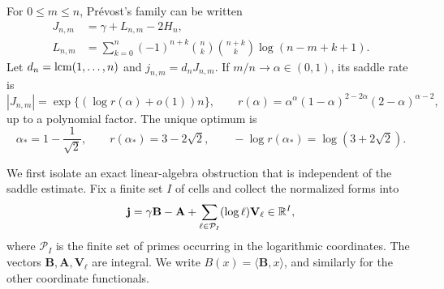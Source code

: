 For \(0\le m\le n\), Pr\'evost's family \cite{Prevost2008} can be written
\begin{align}
 J_{n,m}&=\gamma+L_{n,m}-2H_n,\label{eq:prevost-form}\\
 L_{n,m}&=\sum_{k=0}^n(-1)^{n+k}
 \binom nk\binom{n+k}k\log(n-m+k+1).
 \label{eq:prevost-log}
\end{align}
Let \(d_n=\operatorname{lcm}(1,\ldots,n)\) and \(j_{n,m}=d_nJ_{n,m}\).  If
\(m/n\to\alpha\in(0,1)\), its saddle rate is
\begin{equation}\label{eq:prevost-rate}
 |J_{n,m}|=\exp\{(\log r(\alpha)+o(1))n\},
 \qquad
 r(\alpha)=
 \alpha^\alpha(1-\alpha)^{2-2\alpha}(2-\alpha)^{\alpha-2},
\end{equation}
up to a polynomial factor.  The unique optimum is
\begin{equation}\label{eq:prevost-optimum}
 \alpha_*=1-\frac1{\sqrt2},
 \qquad
 r(\alpha_*)=3-2\sqrt2,
 \qquad
 -\log r(\alpha_*)=\log(3+2\sqrt2).
\end{equation}

We first isolate an exact linear-algebra obstruction that is independent of
the saddle estimate.  Fix a finite set \(I\) of cells and collect the
normalized forms into
\begin{equation}\label{eq:prevost-vector}
 \mathbf j=\gamma\mathbf B-\mathbf A
 +\sum_{\ell\in\mathcal P_I}(\log\ell)\mathbf V_\ell\in\mathbb R^I,
\end{equation}
where \(\mathcal P_I\) is the finite set of primes occurring in the
logarithmic coordinates.  The vectors \(\mathbf B,\mathbf A,\mathbf V_\ell\)
are integral.  We write \(B(x)=\langle\mathbf B,x\rangle\), and similarly
for the other coordinate functionals.

